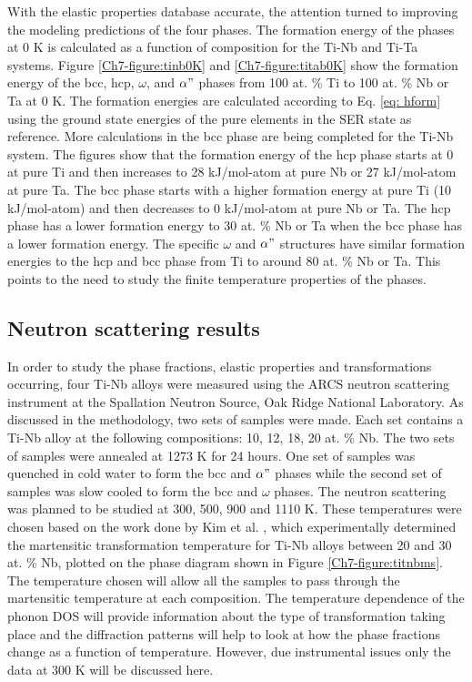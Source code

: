 With the elastic properties database accurate, the attention turned to improving the modeling predictions of the four phases. The formation energy of the phases at 0 K is calculated as a function of composition for the Ti-Nb and Ti-Ta systems. Figure \ref{Ch7-figure:tinb0K} and \ref{Ch7-figure:titab0K} show the formation energy of the bcc, hcp, $\omega$, and $\alpha"$ phases from 100 at. \% Ti to 100 at. \% Nb or Ta at 0 K. The formation energies are calculated according to Eq. \ref{eq: hform} using the ground state energies of the pure elements in the SER state as reference. More calculations in the bcc phase are being completed for the Ti-Nb system. The figures show that the formation energy of the hcp phase starts at 0 at pure Ti and then increases to 28 kJ/mol-atom at pure Nb or 27 kJ/mol-atom at pure Ta. The bcc phase starts with a higher formation energy at pure Ti (10 kJ/mol-atom) and then decreases to 0 kJ/mol-atom at pure Nb or Ta. The hcp phase has a lower formation energy to 30 at. \% Nb or Ta when the bcc phase has a lower formation energy. The specific $\omega$ and $\alpha"$ structures have similar formation energies to the hcp and bcc phase from Ti to around 80 at. \% Nb or Ta. This points to the need to study the finite temperature properties of the phases. 

\subsection{Neutron scattering results}

In order to study the phase fractions, elastic properties and transformations occurring, four Ti-Nb alloys were measured using the ARCS neutron scattering instrument at the Spallation Neutron Source, Oak Ridge National Laboratory. As discussed in the methodology, two sets of samples were made. Each set contains a Ti-Nb alloy at the following compositions: 10, 12, 18, 20 at. \% Nb. The two sets of samples were annealed at 1273 K for 24 hours. One set of samples was quenched in cold water to form the bcc and $\alpha"$ phases while the second set of samples was slow cooled to form the bcc and $\omega$ phases. The neutron scattering was planned to be studied at 300, 500, 900 and 1110 K. These temperatures were chosen based on the work done by Kim et al. \cite{Kim2006}, which experimentally determined the martensitic transformation temperature for Ti-Nb alloys between 20 and 30 at. \% Nb, plotted on the phase diagram shown in Figure \ref{Ch7-figure:titnbms}. The temperature chosen will allow all the samples to pass through the martensitic temperature at each composition. The temperature dependence of the phonon DOS will provide information about the type of transformation taking place and the diffraction patterns will help to look at how the phase fractions change as a function of temperature. However, due instrumental issues only the data at 300 K will be discussed here.

